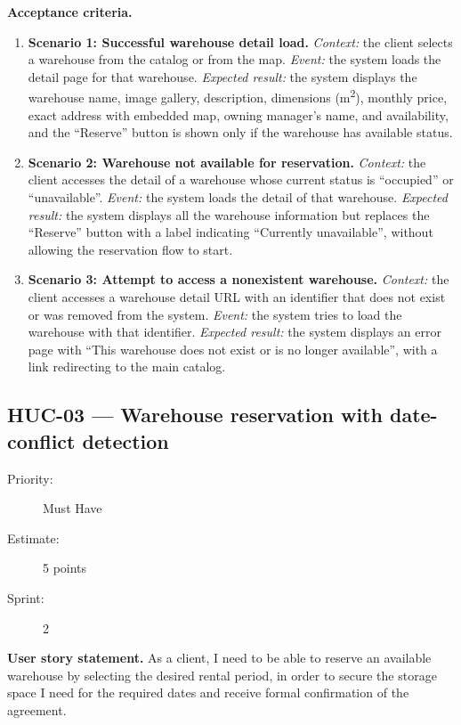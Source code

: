 \documentclass[11pt,a4paper,oneside]{report}
\begin{document}
\textbf{Acceptance criteria.}
\begin{enumerate}
\item \textbf{Scenario 1: Successful warehouse detail load.} \emph{Context:} the client selects a warehouse from the catalog or from the map. \emph{Event:} the system loads the detail page for that warehouse. \emph{Expected result:} the system displays the warehouse name, image gallery, description, dimensions (m\textsuperscript{2}), monthly price, exact address with embedded map, owning manager's name, and availability, and the ``Reserve'' button is shown only if the warehouse has available status.
\item \textbf{Scenario 2: Warehouse not available for reservation.} \emph{Context:} the client accesses the detail of a warehouse whose current status is ``occupied'' or ``unavailable''. \emph{Event:} the system loads the detail of that warehouse. \emph{Expected result:} the system displays all the warehouse information but replaces the ``Reserve'' button with a label indicating ``Currently unavailable'', without allowing the reservation flow to start.
\item \textbf{Scenario 3: Attempt to access a nonexistent warehouse.} \emph{Context:} the client accesses a warehouse detail URL with an identifier that does not exist or was removed from the system. \emph{Event:} the system tries to load the warehouse with that identifier. \emph{Expected result:} the system displays an error page with ``This warehouse does not exist or is no longer available'', with a link redirecting to the main catalog.
\end{enumerate}

\subsection{HUC-03 --- Warehouse reservation with date-conflict detection}
\label{req:HUC-03}
\begin{description}
\item[Priority:] Must Have \quad \item[Estimate:] 5 points \quad \item[Sprint:] 2
\end{description}

\textbf{User story statement.} As a client, I need to be able to reserve an available warehouse by selecting the desired rental period, in order to secure the storage space I need for the required dates and receive formal confirmation of the agreement.
\end{document}
